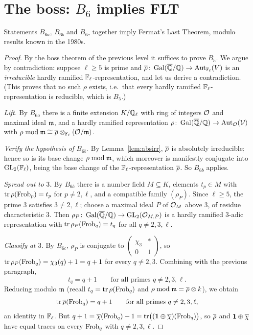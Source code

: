\documentclass[11pt]{article}
\begin{document}
\section{The boss: $B_6$ implies FLT}

\begin{theorem}\label{thm:boss6}
Statements $B_{6a}$, $B_{6b}$ and $B_{6c}$ together imply Fermat's Last
Theorem, modulo results known in the 1980s.
\end{theorem}

\begin{proof}
By the boss theorem of the previous level it suffices to prove $B_5$. We argue
by contradiction: suppose $\ell\geq5$ is prime and
$\overline{\rho}\colon\operatorname{Gal}(\overline{\mathbb{Q}}/\mathbb{Q})\to\operatorname{Aut}_{\mathbb{F}_\ell}(V)$ is an \emph{irreducible} hardly ramified
$\mathbb{F}_\ell$-representation, and let us derive a contradiction. (This proves that
no such $\rho$ exists, i.e.\ that every hardly ramified
$\mathbb{F}_\ell$-representation is reducible, which is $B_5$.)

\medskip\noindent\emph{Lift.} By $B_{6a}$ there is a finite extension $K/\mathbb{Q}_\ell$
with ring of integers $\mathcal{O}$ and maximal ideal $\mathfrak{m}$, and a hardly ramified
representation $\rho\colon\operatorname{Gal}(\overline{\mathbb{Q}}/\mathbb{Q})\to\operatorname{Aut}_{\mathcal{O}}(\mathcal{V})$ with
$\rho\bmod\mathfrak{m}\cong\overline{\rho}\otimes_{\mathbb{F}_\ell}(\mathcal{O}/\mathfrak{m})$.

\medskip\noindent\emph{Verify the hypothesis of $B_{6b}$.} By
Lemma~\ref{lem:absirr}, $\overline{\rho}$ is absolutely irreducible; hence so is its
base change $\rho\bmod\mathfrak{m}$, which moreover is manifestly conjugate into
$\operatorname{GL}_2(\mathbb{F}_\ell)$, being the base change of the $\mathbb{F}_\ell$-representation
$\overline{\rho}$. So $B_{6b}$ applies.

\medskip\noindent\emph{Spread out to $3$.} By $B_{6b}$ there is a number field
$M\subseteq K$, elements $t_p\in M$ with $\operatorname{tr}\rho(\operatorname{Frob}_p)=t_p$ for $p\neq2,\ell$,
and a compatible family $(\rho_P)$. Since $\ell\geq5$, the prime $3$ satisfies
$3\neq2,\ell$; choose a maximal ideal $P$ of $\mathcal{O}_M$ above $3$, of residue
characteristic $3$. Then $\rho_P\colon\operatorname{Gal}(\overline{\mathbb{Q}}/\mathbb{Q})\to\operatorname{GL}_2(\mathcal{O}_{M,P})$ is a hardly
ramified $3$-adic representation with $\operatorname{tr}\rho_P(\operatorname{Frob}_q)=t_q$ for all
$q\neq2,3,\ell$.

\medskip\noindent\emph{Classify at $3$.} By $B_{6c}$, $\rho_P$ is conjugate to
$\left(\begin{smallmatrix}\chi_3&*\\0&1\end{smallmatrix}\right)$, so
$\operatorname{tr}\rho_P(\operatorname{Frob}_q)=\chi_3(q)+1=q+1$ for every $q\neq2,3$. Combining with the
previous paragraph,
\[
  t_q=q+1\qquad\text{for all primes }q\neq2,3,\ell.
\]
Reducing modulo $\mathfrak{m}$ (recall $t_q=\operatorname{tr}\rho(\operatorname{Frob}_q)$ and
$\rho\bmod\mathfrak{m}=\overline{\rho}\otimes k$), we obtain
\[
  \operatorname{tr}\overline{\rho}(\operatorname{Frob}_q)=q+1\qquad\text{for all primes }q\neq2,3,\ell,
\]
an identity in $\mathbb{F}_\ell$. But $q+1=\overline{\chi}(\operatorname{Frob}_q)+1=\operatorname{tr}\bigl((\mathbf1\oplus\overline{\chi})(\operatorname{Frob}_q)\bigr)$,
so $\overline{\rho}$ and $\mathbf1\oplus\overline{\chi}$ have equal traces on every $\operatorname{Frob}_q$
with $q\neq2,3,\ell$.


\end{proof}
\end{document}
